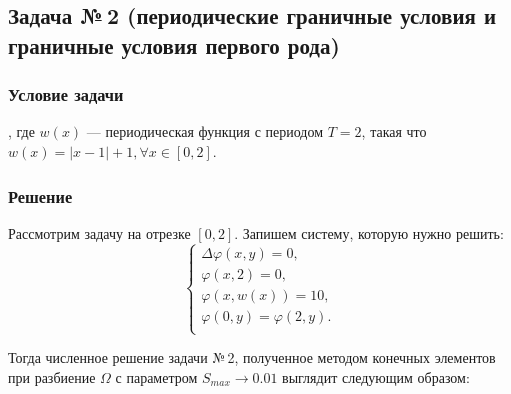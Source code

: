 \documentclass[12pt, a4paper]{article}
\renewcommand{\phi}{\varphi}
\begin{document}
	\newpage
	\subsection{Задача №\,2 (периодические граничные условия и граничные условия первого рода)}
		\subsubsection{Условие задачи}
			, где $w(x)$ --- периодическая функция с периодом $T = 2$, такая что $w(x) = |x - 1| + 1, \forall x \in \left[ 0, 2 \right]$. 
		\subsubsection{Решение}
			Рассмотрим задачу на отрезке $\left[ 0, 2 \right]$. Запишем систему, которую нужно решить:
			\begin{equation*}
				\begin{cases}
					\Delta \phi (x, y)  = 0, \\
					\phi (x, 2) = 0, \\
					\phi (x, w(x)) = 10, \\
					\phi (0, y) = \phi (2, y).\\
				\end{cases}
			\end{equation*}
			
			Тогда численное решение задачи №\,2, полученное методом конечных элементов при разбиение $\Omega$ с параметром $S_{max} \rightarrow 0.01$ выглядит следующим образом: 
		
		
\end{document}
